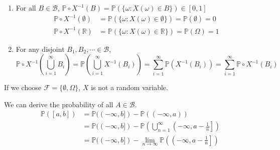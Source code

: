 \documentclass{huhtakm-template-book}
\newcommand{\prob}{\mathbb{P}}
\begin{document}
    \begin{proofing}
        \begin{enumerate}
            \item For all $B\in\mathcal{B}$, $\prob\circ X^{-1}(B)=\prob(\{\omega:X(\omega)\in B\})\in [0,1]$
            \begin{align*}
                \prob\circ X^{-1}(\emptyset)&=\prob(\{\omega:X(\omega)\in\emptyset\})=\prob(\emptyset)=0\\
                \prob\circ X^{-1}(\mathbb{R})&=\prob(\{\omega:X(\omega)\in\mathbb{R}\})=\prob(\Omega)=1
            \end{align*}
            \item For any disjoint $B_{1},B_{2},\cdots\in\mathcal{B}$,
            \begin{equation*}
                \prob\circ X^{-1}\left(\bigcup_{i=1}^{\infty}B_{i}\right)=\prob\left(\bigcup_{i=1}^{\infty}X^{-1}(B_{i})\right)=\sum_{i=1}^{\infty}\prob(X^{-1}(B_{i}))=\sum_{i=1}^{\infty}\prob\circ X^{-1}(B_{i})
            \end{equation*}
        \end{enumerate}
    \end{proofing}
    \begin{eg}
        If we choose $\mathcal{F}=\{\emptyset,\Omega\}$, $X$ is not a random variable.
    \end{eg}
    \begin{rem}
        We can derive the probability of all $A\in\mathcal{B}$.
        \begin{align*}
            \prob([a,b])&=\prob((-\infty,b])-\prob((-\infty,a))\\
            &=\prob((-\infty,b])-\prob\left(\bigcup_{n=1}^{\infty}\left(-\infty,a-\frac{1}{n}\right]\right)\\
            &=\prob((-\infty,b])-\lim_{n\to\infty}\prob\left(\left(-\infty,a-\frac{1}{n}\right]\right)
        \end{align*}
    \end{rem}

    \newpage
\end{document}
